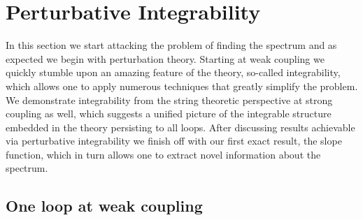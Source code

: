 
\section{Perturbative Integrability}

In this section we start attacking the problem of finding the spectrum and as expected we begin with perturbation theory.
Starting at weak coupling we quickly stumble upon an amazing feature of the theory, so-called integrability, which allows one to apply numerous techniques that greatly simplify the problem.
We demonstrate integrability from the string theoretic perspective at strong coupling as well, which suggests a unified picture of the integrable structure embedded in the theory persisting to all loops.
After discussing results achievable via perturbative integrability we finish off with our first exact result, the slope function, which in turn allows one to extract novel information about the spectrum.

\subsection{One loop at weak coupling}


